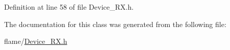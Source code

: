 Definition at line 58 of file Device\-\_\-\-R\-X.\-h.



The documentation for this class was generated from the following file\-:\begin{DoxyCompactItemize}
\item 
flame/\hyperlink{_device___r_x_8h}{Device\-\_\-\-R\-X.\-h}\end{DoxyCompactItemize}
